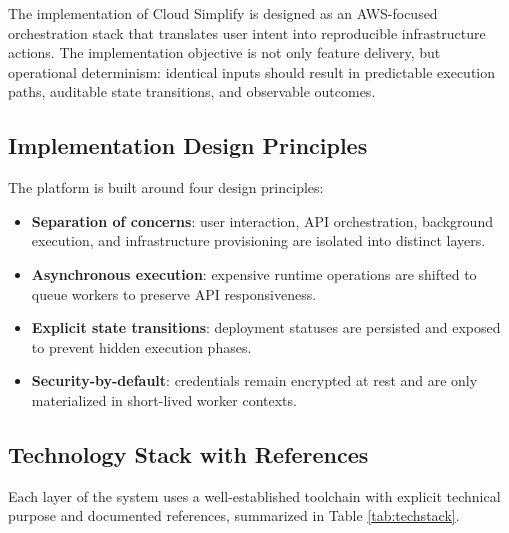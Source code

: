 The implementation of Cloud Simplify is designed as an AWS-focused orchestration stack that translates user intent into reproducible infrastructure actions. The implementation objective is not only feature delivery, but operational determinism: identical inputs should result in predictable execution paths, auditable state transitions, and observable outcomes.

\subsection{Implementation Design Principles}
The platform is built around four design principles:
\begin{itemize}
    \item \textbf{Separation of concerns}: user interaction, API orchestration, background execution, and infrastructure provisioning are isolated into distinct layers.
    \item \textbf{Asynchronous execution}: expensive runtime operations are shifted to queue workers to preserve API responsiveness.
    \item \textbf{Explicit state transitions}: deployment statuses are persisted and exposed to prevent hidden execution phases.
    \item \textbf{Security-by-default}: credentials remain encrypted at rest and are only materialized in short-lived worker contexts.
\end{itemize}

\subsection{Technology Stack with References}
Each layer of the system uses a well-established toolchain with explicit technical purpose and documented references, summarized in Table \ref{tab:techstack}.

